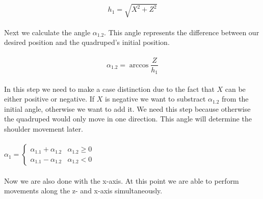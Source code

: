 \documentclass{article}
\begin{document}
    \paragraph{}
    \begin{equation}
        h_1 = \sqrt{X^2 + Z^2}
    \end{equation}

    \paragraph{}
    Next we calculate the angle $\alpha_{1.2}$. This angle represents the difference between our desired position and the quadruped's initial position. 

    \paragraph{}
    \begin{equation}
        \alpha_{1.2} = \arccos \frac{Z}{h_1}
    \end{equation}

    \paragraph{}
    In this step we need to make a case distinction due to the fact that $X$ can be either positive or negative. If $X$ is negative we want to substract $\alpha_{1.2}$ from the initial angle, otherwise we want to add it. We need this step because otherwise the quadruped would only move in one direction. This angle will determine the shoulder movement later.

    \paragraph{}
    \begin{center}
    $\alpha_1 = \left\{
    \begin{array}{ll}
    \alpha_{1.1} + \alpha_{1.2} & \alpha_{1.2} \ge 0 \\
    \alpha_{1.1} - \alpha_{1.2} & \alpha_{1.2} < 0
    \end{array}
    \right. $
    \end{center}

    \paragraph{}
    Now we are also done with the x-axis. At this point we are able to perform movements along the z- and x-axis simultaneously.
\end{document}
